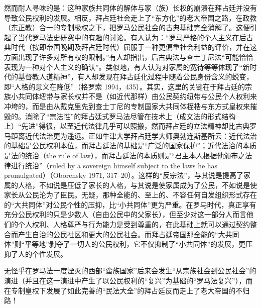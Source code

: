 \documentclass[a4paper,12pt,punct=kaiming]{ctexart}
\begin{document}
然而耐人寻味的是：这种家族共同体的解体与家（族）长权的崩溃在拜占廷并没有导致公民权利的发展。相反，拜占廷社会走上了“东方化”的老大帝国之路，在政教（东正教）合一的专制极权之下，把罗马公民社会的古典基础完全消解了。这便引起了当代罗马法史研究中的有趣的讨论。有人认为：“罗马严格的个人主义在后古典时代（按即帝国晚期及拜占廷时代）屈服于一种更偏重社会利益的评价，并在这方面出现了许多对所有权的限制。”有人却指出，后古典法与查士丁尼法“可能恰恰表现为一种对个人主义的确认”。类似地，有人认为对家属的宽待等等体现了“新时代的基督教人道精神”，有人却发现在拜占廷化过程中随着公民身份含义的蜕变，即“人格的意义在降低”（格罗索 1994，435）。其实，这里的关键在于拜占廷的宗族小共同体纽带与家长权并不是（如近代那样）由公民契约纽带与公民个人权利来冲垮的，而是由从戴克里先到查士丁尼的专制国家大共同体桎梏与东方式皇权来摧毁的。消除了“宗法性”的拜占廷式罗马法尽管在技术上（成文法的形式结构上）“先进”得很，以至近代法律几乎可以照搬，然而拜占廷的立法精神却比古典罗马距离近代法治更为遥远。正如牛津大学拜占廷学大师奥勃连斯基所云：近代法治的基础是公民权利本位，而拜占廷法的基础是“广泛的国家保护”；近代法治的本质是法的统治（the rule of law），而拜占廷法的本质则是“君主本人根据他颁布之法律进行统治”（ruled by a sovereign himself subject to the laws he has promulgated）（Oborensky 1971, 317–20）。这样的“反宗法”，与其说是提高了家属的人格，不如说是压低了家长的人格，与其说是使家属成为了公民，不如说是使家长从公民沦为了臣民。无疑，那种全能的、至上的、不容任何自发组织形式存在的“大共同体”对公民个性的压抑，比“小共同体”更为严重。在罗马时代，真正享有充分公民权利的只是少数人（自由公民中的父家长），但至少对这一部分人而言他们的个人权利、人格尊严与行为能力是受到尊重的，在此基础上就可以通过契约整合而产生自治的公民社区和更大的公民社会。而拜占廷帝国那全能的“大共同体”则“平等地”剥夺了一切人的公民权利，它不仅抑制了“小共同体”的发展，更压抑了人的个性发展。

无怪乎在罗马法一度湮灭的西部“蛮族国家”后来会发生“从宗族社会到公民社会”的演进（并且在这一演进中产生了以公民权利的“复兴”为基础的“罗马法复兴”），而在专制皇权下发展了如此完善的“民法大全”的拜占廷反而走上了老大帝国的不归路！
\end{document}
